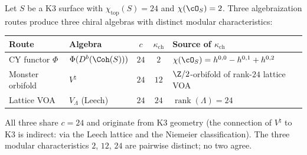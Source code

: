 \begin{proposition}
\label{prop:k3-trichotomy}
Let $S$ be a K3 surface with $\chi_{\mathrm{top}}(S) = 24$ and $\chi(\cO_S) = 2$. Three algebraization routes produce three chiral algebras with distinct modular characteristics:
\begin{center}
\renewcommand{\arraystretch}{1.4}
\begin{tabular}{llccl}
 \toprule
 \textbf{Route} & \textbf{Algebra} & $c$ & $\kappa_{\mathrm{ch}}$ & \textbf{Source of $\kappa_{\mathrm{ch}}$} \\
 \midrule
 CY functor $\Phi$ & $\Phi(D^b(\Coh(S)))$ & $24$ & $2$ & $\chi(\cO_S) = h^{0,0} - h^{0,1} + h^{0,2}$ \\
 Monster orbifold & $V^\natural$ & $24$ & $12$ & $\Z/2$-orbifold of rank-$24$ lattice VOA \\
 Lattice VOA & $V_\Lambda$ (Leech) & $24$ & $24$ & $\operatorname{rank}(\Lambda) = 24$ \\
 \bottomrule
\end{tabular}
\end{center}
All three share $c = 24$ and originate from K3 geometry (the connection of $V^\natural$ to K3 is indirect: via the Leech lattice and the Niemeier classification). The three modular characteristics $2$, $12$, $24$ are pairwise distinct; no two agree.
\ClaimStatusProvedHere
\end{proposition}

